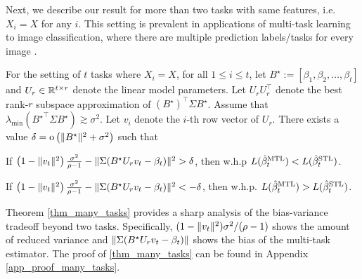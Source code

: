 
Next, we describe our result for more than two tasks with same features, i.e. $X_i = X$ for any $i$.
This setting is prevalent in applications of multi-task learning to image classification, where there are multiple prediction labels/tasks for every image \cite{chexnet17,EA20}.
\begin{theorem}\label{thm_many_tasks}
	For the setting of $t$ tasks where $X_i = X$, for all $1\le i\le t$,
	let $B^\star := [{\beta}_1,{\beta}_2,\dots,{\beta}_{t}]$ and $U_r\in\mathbb{R}^{t\times r}$ denote the linear model parameters.
	Let $U_r U_r^{\top}$ denote the best rank-$r$ subspace approximation of $(B^{\star})^\top\Sigma B^{\star}$.
	Assume that $\lambda_{\min}({B^{\star}}^\top\Sigma B^{\star})\gtrsim \sigma^2$.
	Let $v_i$ denote the $i$-th row vector of $U_r$.
	There exists a value $\delta = \operatorname{o} \left( \|B^\star\|^2 + \sigma^2\right)$ such that
	\squishlist
		\item  If	$\left(1 - \|v_t\|^2 \right)\frac{\sigma^2}{\rho - 1} - \|\Sigma (B^{\star} U_r v_t - \beta_t)\|^2 > \delta$, then w.h.p $L(\hat{\beta}_t^{\text{MTL}}) < L(\hat{\beta}_t^{\text{STL}})$.
		\item If $\left(1 - \|v_t\|^2\right)\frac{\sigma^2}{\rho - 1} - \|\Sigma(B^{\star} U_r v_t - \beta_t)\|^2 < -\delta$, then w.h.p. $L(\hat{\beta}_t^{\text{MTL}}) > L(\hat{\beta}_t^{\text{STL}})$.
	\squishend
\end{theorem}
Theorem \ref{thm_many_tasks} provides a sharp analysis of the bias-variance tradeoff beyond two tasks.
Specifically, $(1 - \|v_t\|^2)\sigma^2/(\rho - 1)$ shows the amount of reduced variance and $\|\Sigma (B^{\star} U_r v_t - \beta_t)\|$ shows the bias of the multi-task estimator.
The proof of \ref{thm_many_tasks} can be found in Appendix \ref{app_proof_many_tasks}.



